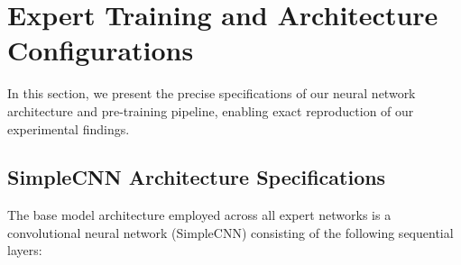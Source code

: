 \documentclass{article}
\theoremstyle{plain}
\theoremstyle{definition}
\theoremstyle{remark}
\begin{document}
\newpage
\appendix
\onecolumn
\section{Expert Training and Architecture Configurations}
\label{app:training_specs}

In this section, we present the precise specifications of our neural network architecture and pre-training pipeline, enabling exact reproduction of our experimental findings.

\subsection{SimpleCNN Architecture Specifications}
The base model architecture employed across all expert networks is a convolutional neural network (SimpleCNN) consisting of the following sequential layers:
\end{document}

